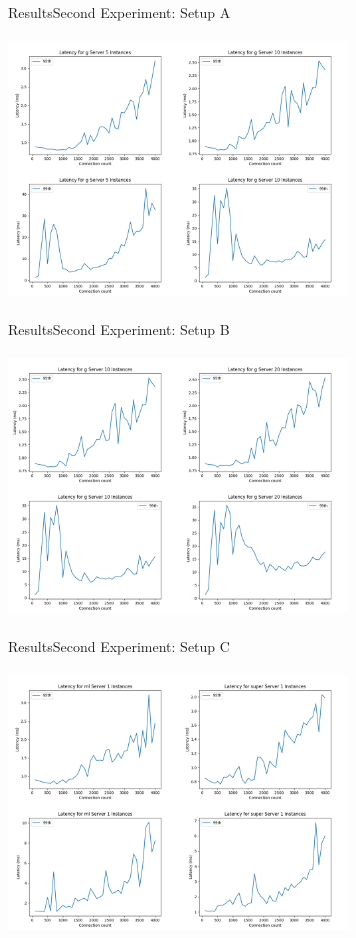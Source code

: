 \documentclass{beamer}
\begin{document}
\begin{frame}{Results}{Second Experiment: Setup A}
  \begin{center}
   \includegraphics[height=7cm, width=9cm]{figures/g5_10.png}
  \end{center}
\end{frame}

\begin{frame}{Results}{Second Experiment: Setup B}
  \begin{center}
   \includegraphics[height=7cm, width=9cm]{figures/g10_20.png}
  \end{center}
\end{frame}

\begin{frame}{Results}{Second Experiment: Setup C}
  \begin{center}
   \includegraphics[height=7cm, width=9cm]{figures/ml1_super1.png}
  \end{center}
\end{frame}
\end{document}
